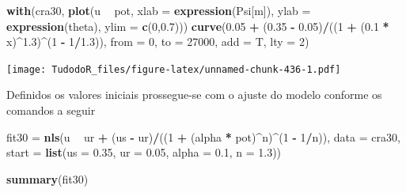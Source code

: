 \documentclass[
]{book}
\newenvironment{Shaded}{\begin{snugshade}}{\end{snugshade}}
\newcommand{\DataTypeTok}[1]{\textcolor[rgb]{0.13,0.29,0.53}{#1}}
\newcommand{\DecValTok}[1]{\textcolor[rgb]{0.00,0.00,0.81}{#1}}
\newcommand{\FloatTok}[1]{\textcolor[rgb]{0.00,0.00,0.81}{#1}}
\newcommand{\KeywordTok}[1]{\textcolor[rgb]{0.13,0.29,0.53}{\textbf{#1}}}
\newcommand{\NormalTok}[1]{#1}
\newcommand{\OperatorTok}[1]{\textcolor[rgb]{0.81,0.36,0.00}{\textbf{#1}}}
\newcommand{\StringTok}[1]{\textcolor[rgb]{0.31,0.60,0.02}{#1}}
\begin{document}
\begin{Shaded}
\begin{Highlighting}[]
\KeywordTok{with}\NormalTok{(cra30, }\KeywordTok{plot}\NormalTok{(u }\OperatorTok{~}\StringTok{ }\NormalTok{pot, }\DataTypeTok{xlab =} \KeywordTok{expression}\NormalTok{(Psi[m]), }
                 \DataTypeTok{ylab =} \KeywordTok{expression}\NormalTok{(theta),}
                 \DataTypeTok{ylim =} \KeywordTok{c}\NormalTok{(}\DecValTok{0}\NormalTok{,}\FloatTok{0.7}\NormalTok{))) }
        \KeywordTok{curve}\NormalTok{(}\FloatTok{0.05} \OperatorTok{+}\StringTok{ }\NormalTok{(}\FloatTok{0.35} \OperatorTok{-}\StringTok{ }\FloatTok{0.05}\NormalTok{)}\OperatorTok{/}\NormalTok{((}\DecValTok{1} \OperatorTok{+}\StringTok{ }\NormalTok{(}\FloatTok{0.1} \OperatorTok{*}\StringTok{ }\NormalTok{x)}\OperatorTok{^}\FloatTok{1.3}\NormalTok{)}\OperatorTok{^}\NormalTok{(}\DecValTok{1} \OperatorTok{-}\StringTok{ }\DecValTok{1}\OperatorTok{/}\FloatTok{1.3}\NormalTok{)), }\DataTypeTok{from =} \DecValTok{0}\NormalTok{, }
  \DataTypeTok{to =} \DecValTok{27000}\NormalTok{, }\DataTypeTok{add =}\NormalTok{ T, }\DataTypeTok{lty =} \DecValTok{2}\NormalTok{)}
\end{Highlighting}
\end{Shaded}

\texttt{[image: TudodoR\_files/figure-latex/unnamed-chunk-436-1.pdf]}

Definidos os valores iniciais prossegue-se com o ajuste do modelo conforme os comandos a seguir

\begin{Shaded}
\begin{Highlighting}[]
\NormalTok{fit30 =}\StringTok{ }\KeywordTok{nls}\NormalTok{(u }\OperatorTok{~}\StringTok{ }\NormalTok{ur }\OperatorTok{+}\StringTok{ }\NormalTok{(us }\OperatorTok{-}\StringTok{ }\NormalTok{ur)}\OperatorTok{/}\NormalTok{((}\DecValTok{1} \OperatorTok{+}\StringTok{ }\NormalTok{(alpha }\OperatorTok{*}\StringTok{ }\NormalTok{pot)}\OperatorTok{^}\NormalTok{n)}\OperatorTok{^}\NormalTok{(}\DecValTok{1} \OperatorTok{-}\StringTok{ }\DecValTok{1}\OperatorTok{/}\NormalTok{n)), }\DataTypeTok{data =}\NormalTok{ cra30, }\DataTypeTok{start =} \KeywordTok{list}\NormalTok{(}\DataTypeTok{us =} \FloatTok{0.35}\NormalTok{, }\DataTypeTok{ur =} \FloatTok{0.05}\NormalTok{, }\DataTypeTok{alpha =} \FloatTok{0.1}\NormalTok{, }\DataTypeTok{n =} \FloatTok{1.3}\NormalTok{))}

\KeywordTok{summary}\NormalTok{(fit30)}
\end{Highlighting}
\end{Shaded}
\end{document}
